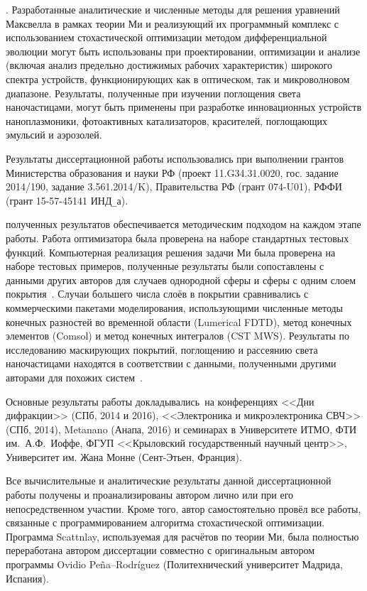 {\influence}. Разработанные аналитические и численные методы для решения
уравнений Максвелла в рамках теории Ми и реализующий их
программный комплекс с использованием стохастической оптимизации
методом дифференциальной эволюции могут быть использованы при
проектировании, оптимизации и анализе (включая анализ предельно
достижимых рабочих характеристик) широкого спектра устройств,
функционирующих как в оптическом, так и микроволновом диапазоне.
Результаты, полученные при изучении поглощения света наночастицами, могут
быть применены при разработке инновационных устройств
наноплазмоники, фотоактивных катализаторов, красителей, поглощающих
эмульсий и аэрозолей.

Результаты диссертационной работы использовались при выполнении
грантов Министерства образования и науки РФ
(проект 11.G34.31.0020, гос. задание 2014/190, задание 3.561.2014/K),
Правительства РФ (грант 074-U01), РФФИ (грант 15-57-45141 ИНД\verb+_+а).


{\reliability} полученных результатов обеспечивается методическим
подходом на каждом этапе работы. Работа оптимизатора была проверена на
наборе стандартных тестовых функций. Компьютерная реализация решения
задачи Ми была проверена на наборе тестовых примеров, полученные
результаты были сопоставлены с данными других авторов для случаев однородной сферы и сферы с одним слоем
покрытия~\cite{Suzuki-2013, Bashevoy-2005}.  Случаи большего числа
слоёв в покрытии сравнивались с коммерческими пакетами моделирования,
использующими численные методы конечных разностей во временной области
(Lumerical FDTD), метод конечных элементов (Comsol) и метод конечных
интегралов (CST MWS). Результаты по исследованию маскирующих покрытий,
поглощению и рассеянию света наночастицами находятся в соответствии с
данными, полученными другими авторами для похожих
систем~\cite{Semouchkina-2013, Alu-2014, Fan-2011}.

{\probation} Основные результаты работы докладывались~на конференциях
<<Дни дифракции>> (СПб, 2014 и 2016), <<Электроника и микроэлектроника
СВЧ>> (СПб, 2014), Metanano (Анапа, 2016) и семинарах в Университете
ИТМО, ФТИ им.~А.Ф.~Иоффе, ФГУП <<Крыловский государственный научный
центр>>, Университет им. Жана Монне (Сент-Этьен, Франция).

{\contribution} Все вычислительные и аналитические результаты данной
диссертационной работы получены и проанализированы автором лично
 или
при его непосредственном участии.  Кроме того, автор самостоятельно
провёл все работы, связанные с программированием алгоритма
стохастической оптимизации.  Программа Scattnlay, используемая для
расчётов по теории Ми, была полностью переработана автором диссертации
совместно с оригинальным автором программы Ovidio
Pe\~{n}a--Rodr\'{i}guez (Политехнический университет Мадрида, Испания).

